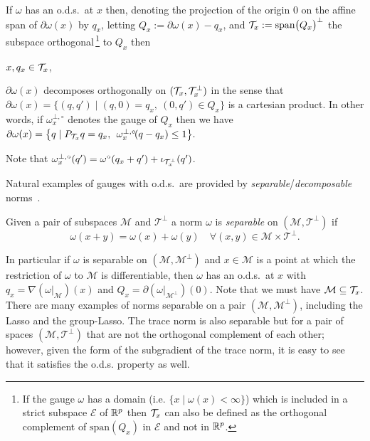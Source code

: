 \documentclass{article}
\begin{document}
\begin{prop}
\label{prop:ods}
If $\omega$ has an o.d.s.\ at $x$ then, denoting the projection of the origin $0$ on the affine span of $\partial \omega(x)$ by $q_x$, letting 
$Q_x:=\partial \omega(x)-q_x$, and
$\mathcal{T}_x:=\text{span}\big (Q_x\big)^{\bot}$ the subspace orthogonal\,\footnote{If the gauge $\omega$ has a domain (i.e. $\{x \mid \omega(x)< \infty \}$) which is included in a strict subspace $\mathcal{E}$ of $\mathbb{R}^p$ then $\mathcal{T}_x$ can also be defined as the orthogonal complement of $\text{span}(Q_x)$ in $\mathcal{E}$ and not in $\mathbb{R}^p$.} to $Q_x$
 then 
\BIT
\item $x, q_x \in \mathcal{T}_x$,
\item $\partial \omega(x)$ decomposes orthogonally on $(\mathcal{T}_x,\mathcal{T}_x^{\bot})$ in the sense that $\partial \omega(x)=\{(q,q') \mid (q,0)=q_x, \: (0,q') \in Q_x\}$ is a cartesian product.
\EIT
In other words, if $\omega_x^{\bot,\circ}$ denotes the gauge of $Q_x$ then we have $\partial \omega(x)=\big \{q \mid P_{\mathcal{T}_x}q=q_x, \:\: \omega_x^{\bot,\circ}\! (q-q_x) \leq 1\big\}.$ 
\end{prop}

Note that $\omega_x^{\bot,\circ}(q')=\omega^{\circ}(q_x+q')+\iota_{\mathcal{T}_x^{\bot}}(q')$.\vspace{2mm}

Natural examples of gauges with o.d.s.\ are provided by \emph{separable}/\emph{decomposable} norms~\citep{negahban2012unified}.

\begin{mydef}
Given a pair of subspaces $\mathcal{M}$ and $\mathcal{T}^{\perp}$ a norm $\omega$ is
\emph{separable} on $(\mathcal{M},\mathcal{T}^{\perp})$ if
$$
\omega(x+y)=\omega(x)+\omega(y) \quad \forall (x,y)\in\mathcal{M}\times\mathcal{T}^{\perp}.
$$
\end{mydef}

In particular if $\omega$ is separable on $(\mathcal{M},\mathcal{M}^{\perp})$ and $x \in \mathcal{M}$ is a point at which the restriction of $\omega$ to $\mathcal{M}$ is differentiable, then $\omega$ has an o.d.s.\ at $x$ with $q_x=\nabla (\omega|_{\mathcal{M}})(x)$ and $Q_x=\partial (\omega|_{\mathcal{M}^{\perp}})(0).$ Note that we must have $\mathcal{M} \subseteq \mathcal{T}_x$. There are many examples of norms separable on a pair $(\mathcal{M},\mathcal{M}^{\perp})$, including the Lasso and the group-Lasso.
The trace norm is also separable but for a pair of spaces $(\mathcal{M},\mathcal{T}^{\perp})$ that are not the orthogonal complement of each other; however, given the form of the subgradient of the trace norm, it is easy to see that it satisfies the o.d.s. property as well.
\end{document}
